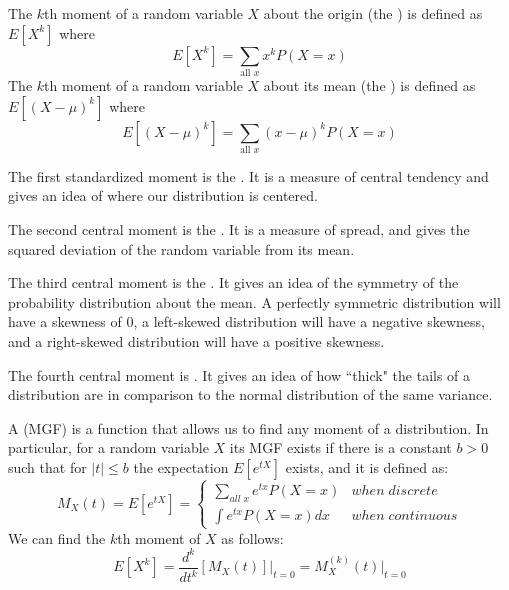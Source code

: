 \documentclass[12pt]{report}
\begin{document}
\begin{defn}{}{}
    The $k$th moment of a random variable $X$ about the origin (the ) is defined as $E[X^k]$ where \begin{equation*}
        E[X^k] = \sum\limits_{\text{all } x} x^kP(X=x)
    \end{equation*}
    The $k$th moment of a random variable $X$ about its mean (the ) is defined as $E[(X-\mu)^k]$ where \begin{equation*}
        E[(X-\mu)^k] = \sum\limits_{\text{all } x} (x-\mu)^kP(X=x)
    \end{equation*}
\end{defn}

\begin{defn}{}{}
    The first standardized moment is the . It is a measure of central tendency and gives an idea of where our distribution is centered.
\end{defn}


\begin{defn}{}{}
    The second central moment is the . It is a measure of spread, and gives the squared deviation of the random variable from its mean.
\end{defn}

\begin{defn}{}{}
    The third central moment is the . It gives an idea of the symmetry of the probability distribution about the mean. A perfectly symmetric distribution will have a skewness of $0$, a left-skewed distribution will have a negative skewness, and a right-skewed distribution will have a positive skewness.
\end{defn}

\begin{defn}{}{}
    The fourth central moment is . It gives an idea of how ``thick" the tails of a distribution are in comparison to the normal distribution of the same variance.
\end{defn}


\begin{defn}{}{}
    A  (MGF) is a function that allows us to find any moment of a distribution. In particular, for a random variable $X$ its MGF exists if there is a constant $b > 0$ such that for $|t| \leq b$ the expectation $E[e^{tX}]$ exists, and it is defined as: \begin{equation*}
        M_X(t) = E[e^{tX}] = \left\{\begin{array}{lc} \sum\limits_{all\;x}e^{tx}P(X=x) & when\;discrete \\ \int e^{tx}P(X=x)dx & when\;continuous\end{array}\right.
    \end{equation*}
    We can find the $k$th moment of $X$ as follows: \begin{equation*}
        E[X^k] = \frac{d^k}{dt^k}[M_X(t)]\Big\rvert_{t=0} = M_X^{(k)}(t)\Big\rvert_{t=0}
    \end{equation*}
\end{defn}
\end{document}

